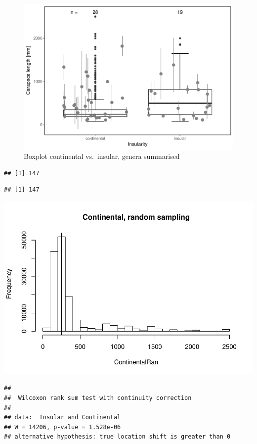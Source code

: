 \documentclass[]{article}
\begin{document}
\begin{figure}[htbp]
\centering
\includegraphics{MA_JJ_files/figure-latex/BPCI-1.pdf}
\caption{Boxplot continental vs.~insular, genera summarised}
\end{figure}

\begin{verbatim}
## [1] 147
\end{verbatim}

\begin{verbatim}
## [1] 147
\end{verbatim}

\includegraphics{MA_JJ_files/figure-latex/RSCI-1.pdf}

\begin{verbatim}
## 
##  Wilcoxon rank sum test with continuity correction
## 
## data:  Insular and Continental
## W = 14206, p-value = 1.528e-06
## alternative hypothesis: true location shift is greater than 0
\end{verbatim}
\end{document}
